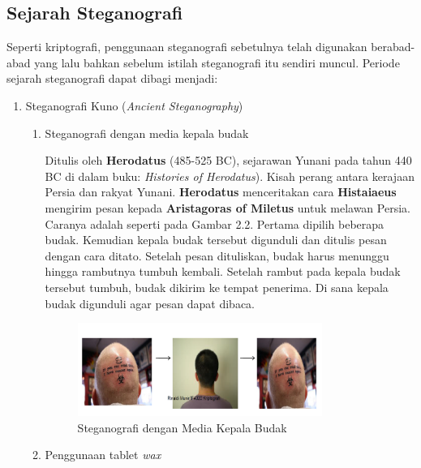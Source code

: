 	\subsection{Sejarah Steganografi}
	Seperti kriptografi, penggunaan steganografi sebetulnya telah digunakan berabad-abad yang lalu bahkan sebelum istilah steganografi itu sendiri muncul. Periode sejarah steganografi dapat dibagi menjadi:
	\begin{enumerate}
		\item Steganografi Kuno (\emph{Ancient Steganography})
			\begin{enumerate}
				\item Steganografi dengan media kepala budak
				
				Ditulis oleh \textbf{Herodatus} (485-525 BC), sejarawan Yunani pada tahun 440 BC di dalam buku: \emph{Histories of Herodatus}). Kisah perang antara kerajaan Persia dan rakyat Yunani. \textbf{Herodatus} menceritakan cara \textbf{Histaiaeus} mengirim pesan kepada \textbf{Aristagoras of Miletus} untuk melawan Persia. Caranya adalah seperti pada Gambar 2.2. Pertama dipilih beberapa budak. Kemudian kepala budak tersebut digunduli dan ditulis pesan dengan cara ditato. Setelah pesan dituliskan, budak harus menunggu hingga rambutnya tumbuh kembali. Setelah rambut pada kepala budak tersebut tumbuh, budak dikirim ke tempat penerima. Di sana kepala budak digunduli agar pesan dapat dibaca.
					\begin{figure}[H]
						\centering
						\includegraphics[width=0.8\textwidth]{gambar/steganografi_kepalabudak}
						\caption{Steganografi dengan Media Kepala Budak}
						\label{steganografi_kepalabudak}
					\end{figure}
				
				\item Penggunaan tablet \emph{wax}
				

\end{enumerate}
\end{enumerate}
